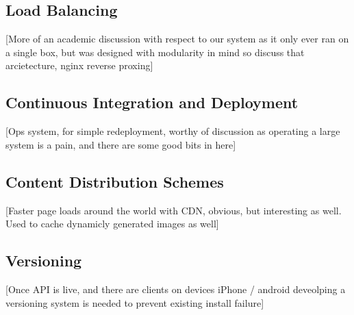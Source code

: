 \documentclass[a4paper,12pt,titlepage]{report}
\begin{document}
\subsection{Load Balancing} %
\label{sub:load_balancing}

[More of an academic discussion with respect to our system as it only ever ran on a single box, but was designed with modularity in mind so discuss that arcietecture, nginx reverse proxing]


\subsection{Continuous Integration and Deployment} %
\label{sub:continuous_integration_and_deployment}

[Ops system, for simple redeployment, worthy of discussion as operating a large system is a pain, and there are some good bits in here]


\subsection{Content Distribution Schemes} %
\label{sub:content_distribution_schemes}

[Faster page loads around the world with CDN, obvious, but interesting as well. Used to cache dynamicly generated images as well]


\subsection{Versioning} %
\label{sub:versioning}

[Once API is live, and there are clients on devices iPhone / android deveolping a versioning system is needed to prevent existing install failure]




\end{document}
